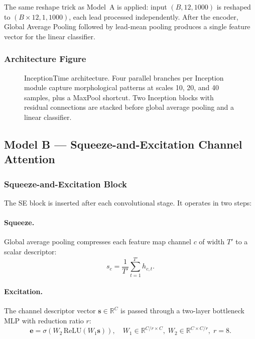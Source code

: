 The same reshape trick as Model~A is applied: input $(B, 12, 1000)$ is
reshaped to $(B\times 12, 1, 1000)$, each lead processed independently.
After the encoder, Global Average Pooling followed by lead-mean pooling
produces a single feature vector for the linear classifier.

\subsubsection{Architecture Figure}

\begin{figure}[htbp]
  \centering
  \caption{InceptionTime architecture.
    Four parallel branches per Inception module capture morphological
    patterns at scales 10, 20, and 40 samples, plus a MaxPool shortcut.
    Two Inception blocks with residual connections are stacked before
    global average pooling and a linear classifier.}
  \label{fig:inception}
\end{figure}

\subsection{Model B --- Squeeze-and-Excitation Channel Attention}
\label{subsec:model_b}

\subsubsection{Squeeze-and-Excitation Block}

The SE block \cite{ref5} is inserted after each convolutional stage.
It operates in two steps:

\paragraph{Squeeze.}
Global average pooling compresses each feature map channel $c$ of width
$T'$ to a scalar descriptor:
\begin{equation}
  s_c = \frac{1}{T'}\sum_{t=1}^{T'} h_{c,t}.
  \label{eq:squeeze}
\end{equation}

\paragraph{Excitation.}
The channel descriptor vector $\mathbf{s} \in \mathbb{R}^C$ is passed
through a two-layer bottleneck MLP with reduction ratio $r$:
\begin{equation}
  \mathbf{e} = \sigma\!\left(
    W_2\, \mathrm{ReLU}(W_1 \mathbf{s})
  \right), \quad
  W_1 \in \mathbb{R}^{C/r \times C},\;
  W_2 \in \mathbb{R}^{C \times C/r},\;
  r = 8.
  \label{eq:excitation}
\end{equation}

